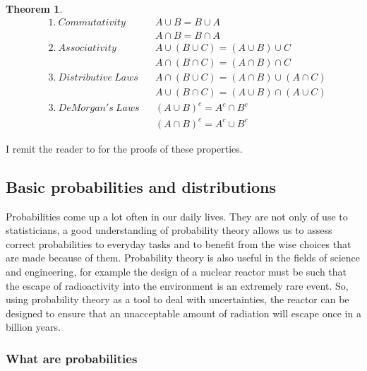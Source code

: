 \documentclass[
  oneside,
  11pt, a4paper,
  footinclude=true,
  headinclude=true,
  cleardoublepage=empty
]{scrbook}
\theoremstyle{definition}
\theoremstyle{definition}
\newtheorem{theorem}{Theorem}[section]
\begin{document}
            \begin{theorem}{}
            \begin{align*}
                &1.\ Commutativity && A \cup B = B \cup A \\
                &                  && A \cap B = B \cap A \\
                &2.\ Associativity && A \cup (B \cup C) = (A \cup B) \cup C \\
                &                  && A \cap (B \cap C) = (A \cap B) \cap C \\
                &3.\ Distributive\ Laws && A \cap (B \cup C) = (A \cap B) \cup (A \cap C) \\
                &                       && A \cup (B \cap C) = (A \cup B) \cap (A \cup C) \\
                &3.\ DeMorgan's\ Laws && (A \cup B)^c = A^c \cap B^c \\
                &                     && (A \cap B)^c = A^c \cup B^c
            \end{align*}{}
            \end{theorem}
            
            I remit the reader to \cite{CaseBerg:01} for the proofs of these properties.
        
        \subsection{Basic probabilities and distributions}
        
            Probabilities come up a lot often in our daily lives. They are not only of use to statisticians, a good understanding of probability theory allows us to assess correct probabilities to everyday tasks and to benefit from the wise choices that are made because of them. Probability theory is also useful in the fields of science and engineering, for example the design of a nuclear reactor must be such that the escape of radioactivity into the environment is an extremely rare event. So, using probability theory as a tool to deal with uncertainties, the reactor can be designed to ensure that an unacceptable amount of radiation will escape once in a billion years.
            
            \subsubsection{What are probabilities}
            
\end{document}

